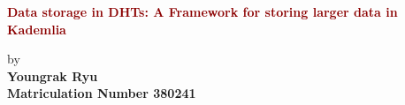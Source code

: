 \begin{titlepage}
	\strut
	\hfill
	\begin{center}
	\vspace{1cm}
		\Huge
		\begin{spacing}{.9}
			\textcolor{DarkRed}{\textbf{Data storage in DHTs: A Framework for storing larger data in Kademlia}}\\
		\end{spacing}
		\vspace{0.8cm}
		\large
		by\\
		\vspace{0.8cm}
		\textbf{Youngrak Ryu}\\
		\vspace{0.8cm}
		\textbf{Matriculation Number 380241}\\

\end{center}
\end{titlepage}

